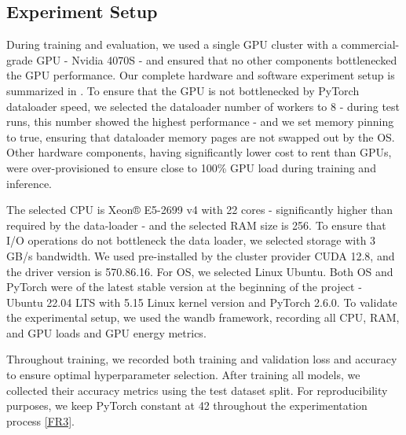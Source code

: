 \subsection{Experiment Setup}

 During training and evaluation, we used a single GPU cluster with a commercial-grade GPU - Nvidia 4070S - and ensured that no other components bottlenecked the GPU performance. Our complete hardware and software experiment setup is summarized in . To ensure that the GPU is not bottlenecked by PyTorch dataloader speed, we selected the dataloader number of workers to 8 - during test runs, this number showed the highest performance - and we set memory pinning to true, ensuring that dataloader memory pages are not swapped out by the OS. Other hardware components, having significantly lower cost to rent than GPUs, were over-provisioned to ensure close to 100\% GPU load during training and inference. 
 
 The selected CPU is Xeon® E5-2699 v4 with 22 cores - significantly higher than required by the data-loader - and the selected RAM size is 256. To ensure that I/O operations do not bottleneck the data loader, we selected storage with 3 GB/s bandwidth. We used pre-installed by the cluster provider CUDA 12.8, and the driver version is 570.86.16. For OS, we selected Linux Ubuntu. Both OS and PyTorch were of the latest stable version at the beginning of the project - Ubuntu 22.04 LTS with 5.15 Linux kernel version and PyTorch 2.6.0. To validate the experimental setup, we used the wandb framework, recording all CPU, RAM, and GPU loads and GPU energy metrics. 
 
 Throughout training, we recorded both training and validation loss and accuracy to ensure optimal hyperparameter selection. After training all models, we collected their accuracy metrics using the test dataset split. For reproducibility purposes, we keep PyTorch constant at 42 throughout the experimentation process \ref{FR3}. 




